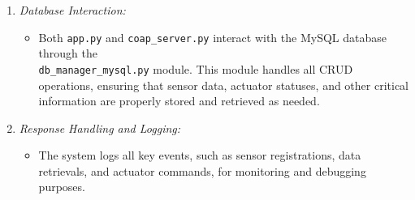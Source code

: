 \begin{enumerate}
    \item \textit{Database Interaction:}
    \begin{itemize}
        \item Both \texttt{app.py} and \texttt{coap\_server.py} interact with the MySQL database through the\\
        \texttt{db\_manager\_mysql.py} module. This module handles all CRUD operations, ensuring that sensor data, actuator statuses, and other critical information are properly stored and retrieved as needed.
    \end{itemize}
    
    \item \textit{Response Handling and Logging:} 
    \begin{itemize}
        \item The system logs all key events, such as sensor registrations, data retrievals, and actuator commands, for monitoring and debugging purposes. 
    \end{itemize}
\end{enumerate}

